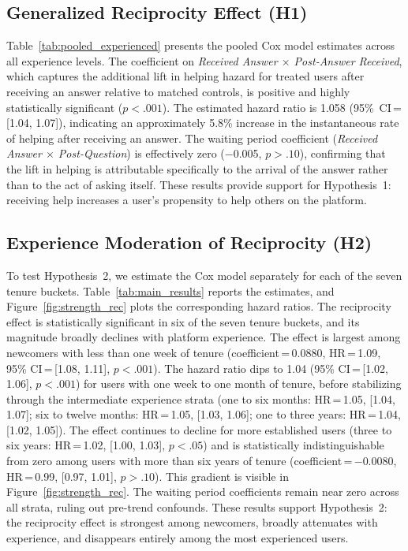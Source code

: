 \subsection{Generalized Reciprocity Effect (H1)}


Table~\ref{tab:pooled_experienced} presents the pooled Cox model estimates across all experience levels. The coefficient on \textit{Received Answer $\times$ Post-Answer Received}, which captures the additional lift in helping hazard for treated users after receiving an answer relative to matched controls, is positive and highly statistically significant ($p < .001$). The estimated hazard ratio is 1.058 (95\%~CI\,=\,[1.04, 1.07]), indicating an approximately 5.8\% increase in the instantaneous rate of helping after receiving an answer. The waiting period coefficient (\textit{Received Answer $\times$ Post-Question}) is effectively zero ($-$0.005, $p > .10$), confirming that the lift in helping is attributable specifically to the arrival of the answer rather than to the act of asking itself. These results provide support for Hypothesis~1: receiving help increases a user's propensity to help others on the platform.




\subsection{Experience Moderation of Reciprocity (H2)}

To test Hypothesis~2, we estimate the Cox model separately for each of the seven tenure buckets. Table~\ref{tab:main_results} reports the estimates, and Figure~\ref{fig:strength_rec} plots the corresponding hazard ratios. The reciprocity effect is statistically significant in six of the seven tenure buckets, and its magnitude broadly declines with platform experience. The effect is largest among newcomers with less than one week of tenure (coefficient\,=\,0.0880, HR\,=\,1.09, 95\% CI\,=\,[1.08, 1.11], $p < .001$). The hazard ratio dips to 1.04 (95\% CI\,=\,[1.02, 1.06], $p < .001$) for users with one week to one month of tenure, before stabilizing through the intermediate experience strata (one to six months: HR\,=\,1.05, [1.04, 1.07]; six to twelve months: HR\,=\,1.05, [1.03, 1.06]; one to three years: HR\,=\,1.04, [1.02, 1.05]). The effect continues to decline for more established users (three to six years: HR\,=\,1.02, [1.00, 1.03], $p < .05$) and is statistically indistinguishable from zero among users with more than six years of tenure (coefficient\,=\,$-$0.0080, HR\,=\,0.99, [0.97, 1.01], $p > .10$). This gradient is visible in Figure~\ref{fig:strength_rec}. The waiting period coefficients remain near zero across all strata, ruling out pre-trend confounds. These results support Hypothesis~2: the reciprocity effect is strongest among newcomers, broadly attenuates with experience, and disappears entirely among the most experienced users.

